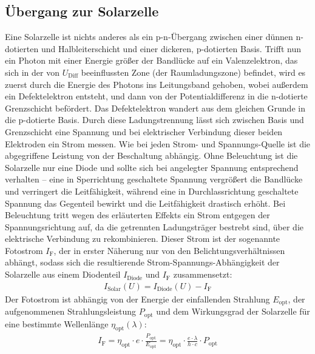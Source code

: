 \documentclass[numbers=noenddot,12pt,a4paper]{scrartcl}
\newcommand{\ix}[1]{_\text{#1}}
\begin{document}
\subsection{Übergang zur Solarzelle}
Eine Solarzelle ist nichts anderes als ein p-n-Übergang zwischen einer dünnen n-dotierten und Halbleiterschicht und einer dickeren, p-dotierten Basis. Trifft nun ein Photon mit einer Energie größer der Bandlücke auf ein Valenzelektron, das sich in der von $U\ix{Diff}$ beeinflussten Zone (der Raumladungszone) befindet, wird es zuerst durch die Energie des Photons ins Leitungsband gehoben, wobei außerdem ein Defektelektron entsteht, und dann von der Potentialdifferenz in die n-dotierte Grenzschicht befördert. Das Defektelektron wandert aus dem gleichen Grunde in die p-dotierte Basis. Durch diese Ladungstrennung lässt sich zwischen Basis und Grenzschicht eine Spannung und bei elektrischer Verbindung dieser beiden Elektroden ein Strom messen. Wie bei jeden Strom- und Spannungs-Quelle ist die abgegriffene Leistung von der Beschaltung abhängig. Ohne Beleuchtung ist die Solarzelle nur eine Diode und sollte sich bei angelegter Spannung entsprechend verhalten -- eine in Sperrichtung geschaltete Spannung vergrößert die Bandlücke und verringert die Leitfähigkeit, während eine in Durchlassrichtung geschaltete Spannung das Gegenteil bewirkt und die Leitfähigkeit drastisch erhöht. Bei Beleuchtung tritt wegen des erläuterten Effekts ein Strom entgegen der Spannungsrichtung auf, da die getrennten Ladungsträger bestrebt sind, über die elektrische Verbindung zu rekombinieren. Dieser Strom ist der sogenannte Fotostrom $I\ix{F}$, der in erster Näherung nur von den Belichtungsverhältnissen abhängt, sodass sich die resultierende Strom-Spannungs-Abhängigkeit der Solarzelle aus einem Diodenteil $I\ix{Diode}$ und $I\ix{F}$ zusammensetzt:
\begin{align}
I\ix{Solar}(U)=I\ix{Diode}(U)-I\ix{F}\label{eq:IUbasic}
\end{align}
Der Fotostrom ist abhängig von der Energie der einfallenden Strahlung $E\ix{opt}$, der aufgenommenen Strahlungsleistung $P\ix{opt}$ und dem Wirkungsgrad der Solarzelle für eine bestimmte Wellenlänge $\eta\ix{opt}(\lambda)$:
\begin{align}
I\ix{F}=\eta\ix{opt}\cdot e\cdot \frac{P\ix{opt}}{E\ix{opt}}=\eta\ix{opt}\cdot \frac{e\cdot\lambda}{h\cdot c}\cdot P\ix{opt}
\end{align}
\end{document}
